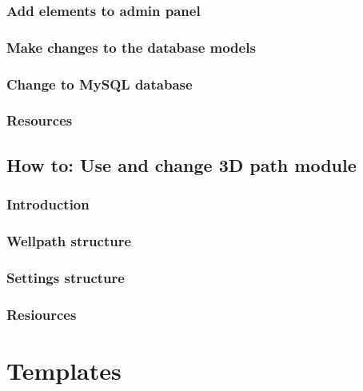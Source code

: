 \documentclass{report}
\begin{document}
\subsection{Add elements to admin panel}
\subsection{Make changes to the database models}
\subsection{Change to MySQL database} \label{sec:change_database}
\subsection{Resources}

\newpage
\section{How to: Use and change 3D path module} \label{sec:use_and_change_frontend}
\subsection{Introduction}
\subsection{Wellpath structure}
\subsection{Settings structure}
\subsection{Resiources}

\chapter{Templates}
\newpage
\end{document}
